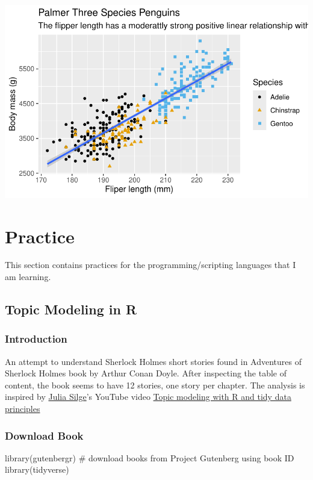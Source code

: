 \documentclass[
  letterpaper,
  DIV=11,
  numbers=noendperiod]{scrreprt}
\newenvironment{Shaded}{\begin{snugshade}}{\end{snugshade}}
\newcommand{\CommentTok}[1]{\textcolor[rgb]{0.37,0.37,0.37}{#1}}
\newcommand{\FunctionTok}[1]{\textcolor[rgb]{0.28,0.35,0.67}{#1}}
\newcommand{\NormalTok}[1]{\textcolor[rgb]{0.00,0.23,0.31}{#1}}
\begin{document}
\includegraphics{src/r-for-data-science/01-data-viz_files/figure-pdf/unnamed-chunk-15-1.pdf}

\part{Practice}

This section contains practices for the programming/scripting languages
that I am learning.

\chapter{Topic Modeling in R}\label{topic-modeling-in-r}

\section{Introduction}\label{introduction}

An attempt to understand Sherlock Holmes short stories found in
Adventures of Sherlock Holmes book by Arthur Conan Doyle. After
inspecting the table of content, the book seems to have 12 stories, one
story per chapter. The analysis is inspired by
\href{https://juliasilge.com/}{Julia Silge}'s YouTube video
\href{https://www.youtube.com/embed/evTuL-RcRpc}{Topic modeling with R
and tidy data principles}

\section{Download Book}\label{download-book}

\begin{Shaded}
\begin{Highlighting}[]
\FunctionTok{library}\NormalTok{(gutenbergr)  }\CommentTok{\# download books from Project Gutenberg using book ID}
\FunctionTok{library}\NormalTok{(tidyverse)}
\end{Highlighting}
\end{Shaded}
\end{document}
